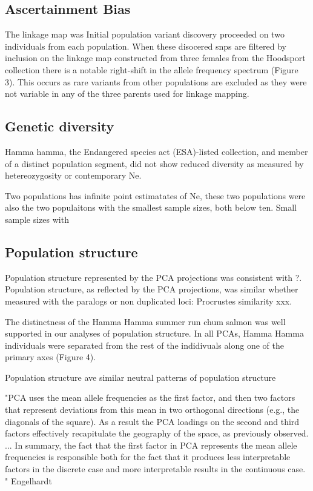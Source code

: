 \documentclass[12pt, one column]{article}
\begin{document}
\subsection*{Ascertainment Bias}
The linkage map was   Initial population variant discovery proceeded on two individuals from each population. When these disocered snps are filtered by inclusion on the linkage map constructed from three females from the Hoodsport collection there is a notable right-shift in the allele frequency spectrum (Figure 3).  This occurs as rare variants from other populations are excluded as they were not variable in any of the three parents used for linkage mapping. 



\subsection*{Genetic diversity}
Hamma hamma, the Endangered species act (ESA)-listed collection, and member of a distinct population segment, did not show reduced diversity as measured by hetereozygosity or contemporary Ne.

Two populations has infinite point estimatates of Ne, these two populations were also the two populaitons with the smallest sample sizes, both below ten.  Small sample sizes  with 

\subsection*{Population structure}

Population structure represented by the PCA projections was consistent with \citet{Small2014}?.  Population structure, as reflected by the PCA projections, was similar whether measured with the paralogs or non duplicated loci: Procrustes similarity xxx. 

The distinctness of the Hamma Hamma summer run chum salmon was well supported in our analyses of population structure.  In all PCAs, Hamma Hamma individuals were separated from the rest of the indidivuals along one of the primary axes (Figure 4).  

Population structure ave similar neutral patterns of population structure 


"PCA uses the mean allele frequencies as the first factor, and then two factors that represent deviations from this mean in two orthogonal directions (e.g., the diagonals of the square). As a result the PCA loadings on the second and third factors effectively recapitulate the geography of the space, as previously observed.
...
In summary, the fact that the first factor in PCA represents the mean allele frequencies is responsible both for the fact that it produces less interpretable factors in the discrete case and more interpretable results in the continuous case.
" {Engelhardt}
\end{document}
